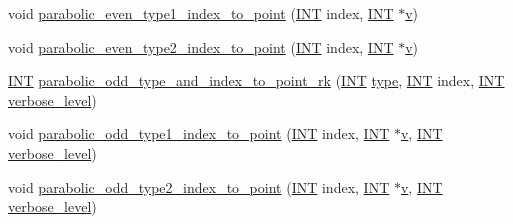 \begin{DoxyCompactItemize}
\item 
void \mbox{\hyperlink{classorthogonal_a6646754b896f772146faceaa4100403f}{parabolic\+\_\+even\+\_\+type1\+\_\+index\+\_\+to\+\_\+point}} (\mbox{\hyperlink{galois_8h_a09fddde158a3a20bd2dcadb609de11dc}{I\+NT}} index, \mbox{\hyperlink{galois_8h_a09fddde158a3a20bd2dcadb609de11dc}{I\+NT}} $\ast$\mbox{\hyperlink{simeon_8_c_aeb3f3030944801b163bc3b829a7f6710}{v}})
\item 
void \mbox{\hyperlink{classorthogonal_ac00a073ffe018536d0b07841b405533a}{parabolic\+\_\+even\+\_\+type2\+\_\+index\+\_\+to\+\_\+point}} (\mbox{\hyperlink{galois_8h_a09fddde158a3a20bd2dcadb609de11dc}{I\+NT}} index, \mbox{\hyperlink{galois_8h_a09fddde158a3a20bd2dcadb609de11dc}{I\+NT}} $\ast$\mbox{\hyperlink{simeon_8_c_aeb3f3030944801b163bc3b829a7f6710}{v}})
\item 
\mbox{\hyperlink{galois_8h_a09fddde158a3a20bd2dcadb609de11dc}{I\+NT}} \mbox{\hyperlink{classorthogonal_aac70113614b52601e38b3ce8cbffbc9a}{parabolic\+\_\+odd\+\_\+type\+\_\+and\+\_\+index\+\_\+to\+\_\+point\+\_\+rk}} (\mbox{\hyperlink{galois_8h_a09fddde158a3a20bd2dcadb609de11dc}{I\+NT}} \mbox{\hyperlink{_l_i_b_2_g_a_l_o_i_s_2dlx_8_c_ad241c8005abf9f323e9fffec67f55abf}{type}}, \mbox{\hyperlink{galois_8h_a09fddde158a3a20bd2dcadb609de11dc}{I\+NT}} index, \mbox{\hyperlink{galois_8h_a09fddde158a3a20bd2dcadb609de11dc}{I\+NT}} \mbox{\hyperlink{simeon_8_c_a818073fbcc2f439e7c56952f67386122}{verbose\+\_\+level}})
\item 
void \mbox{\hyperlink{classorthogonal_a90ae2eb18659cb8dcd94eafc0b4eccf7}{parabolic\+\_\+odd\+\_\+type1\+\_\+index\+\_\+to\+\_\+point}} (\mbox{\hyperlink{galois_8h_a09fddde158a3a20bd2dcadb609de11dc}{I\+NT}} index, \mbox{\hyperlink{galois_8h_a09fddde158a3a20bd2dcadb609de11dc}{I\+NT}} $\ast$\mbox{\hyperlink{simeon_8_c_aeb3f3030944801b163bc3b829a7f6710}{v}}, \mbox{\hyperlink{galois_8h_a09fddde158a3a20bd2dcadb609de11dc}{I\+NT}} \mbox{\hyperlink{simeon_8_c_a818073fbcc2f439e7c56952f67386122}{verbose\+\_\+level}})
\item 
void \mbox{\hyperlink{classorthogonal_a7bbc04bb592d92a5dc35b77f33811fe0}{parabolic\+\_\+odd\+\_\+type2\+\_\+index\+\_\+to\+\_\+point}} (\mbox{\hyperlink{galois_8h_a09fddde158a3a20bd2dcadb609de11dc}{I\+NT}} index, \mbox{\hyperlink{galois_8h_a09fddde158a3a20bd2dcadb609de11dc}{I\+NT}} $\ast$\mbox{\hyperlink{simeon_8_c_aeb3f3030944801b163bc3b829a7f6710}{v}}, \mbox{\hyperlink{galois_8h_a09fddde158a3a20bd2dcadb609de11dc}{I\+NT}} \mbox{\hyperlink{simeon_8_c_a818073fbcc2f439e7c56952f67386122}{verbose\+\_\+level}})
\item 

\end{DoxyCompactItemize}
